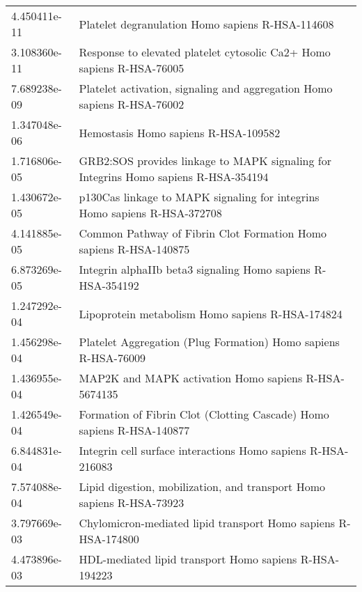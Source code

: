 \begin{longtable}{p{2.4cm}p{14.5cm}}
\bottomrule
\endlastfoot
             4.450411e-11 &                                              Platelet degranulation Homo sapiens R-HSA-114608 \\
             3.108360e-11 &                         Response to elevated platelet cytosolic Ca2+ Homo sapiens R-HSA-76005 \\
             7.689238e-09 &                       Platelet activation, signaling and aggregation Homo sapiens R-HSA-76002 \\
             1.347048e-06 &                                                          Hemostasis Homo sapiens R-HSA-109582 \\
             1.716806e-05 &           GRB2:SOS provides linkage to MAPK signaling for Integrins Homo sapiens R-HSA-354194 \\
             1.430672e-05 &                     p130Cas linkage to MAPK signaling for integrins Homo sapiens R-HSA-372708 \\
             4.141885e-05 &                             Common Pathway of Fibrin Clot Formation Homo sapiens R-HSA-140875 \\
             6.873269e-05 &                                   Integrin alphaIIb beta3 signaling Homo sapiens R-HSA-354192 \\
             1.247292e-04 &                                              Lipoprotein metabolism Homo sapiens R-HSA-174824 \\
             1.456298e-04 &                                Platelet Aggregation (Plug Formation) Homo sapiens R-HSA-76009 \\
             1.436955e-04 &                                          MAP2K and MAPK activation Homo sapiens R-HSA-5674135 \\
             1.426549e-04 &                         Formation of Fibrin Clot (Clotting Cascade) Homo sapiens R-HSA-140877 \\
             6.844831e-04 &                                  Integrin cell surface interactions Homo sapiens R-HSA-216083 \\
             7.574088e-04 &                         Lipid digestion, mobilization, and transport Homo sapiens R-HSA-73923 \\
             3.797669e-03 &                                Chylomicron-mediated lipid transport Homo sapiens R-HSA-174800 \\
             4.473896e-03 &                                        HDL-mediated lipid transport Homo sapiens R-HSA-194223 \\

\end{longtable}
